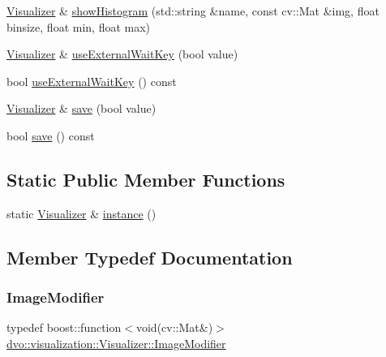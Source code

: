 \begin{DoxyCompactItemize}
\item 
\mbox{\hyperlink{classdvo_1_1visualization_1_1_visualizer}{Visualizer}} \& \mbox{\hyperlink{classdvo_1_1visualization_1_1_visualizer_aca408d9ab7e8e8fc8f9f7c3dd40f0457}{show\+Histogram}} (std\+::string \&name, const cv\+::\+Mat \&img, float binsize, float min, float max)
\item 
\mbox{\hyperlink{classdvo_1_1visualization_1_1_visualizer}{Visualizer}} \& \mbox{\hyperlink{classdvo_1_1visualization_1_1_visualizer_adc47051ac9cbd39cbc94992511137bd6}{use\+External\+Wait\+Key}} (bool value)
\item 
bool \mbox{\hyperlink{classdvo_1_1visualization_1_1_visualizer_a19a81ff0cc68145986c13b1da09affb0}{use\+External\+Wait\+Key}} () const
\item 
\mbox{\hyperlink{classdvo_1_1visualization_1_1_visualizer}{Visualizer}} \& \mbox{\hyperlink{classdvo_1_1visualization_1_1_visualizer_a514dfc248d0676c84161f38132c06cb8}{save}} (bool value)
\item 
bool \mbox{\hyperlink{classdvo_1_1visualization_1_1_visualizer_ad53a6d58f48de5063ca7c196005db380}{save}} () const
\end{DoxyCompactItemize}
\subsection*{Static Public Member Functions}
\begin{DoxyCompactItemize}
\item 
static \mbox{\hyperlink{classdvo_1_1visualization_1_1_visualizer}{Visualizer}} \& \mbox{\hyperlink{classdvo_1_1visualization_1_1_visualizer_a97dc12917863ab3379cea320844c798b}{instance}} ()
\end{DoxyCompactItemize}


\subsection{Member Typedef Documentation}
\mbox{\label{classdvo_1_1visualization_1_1_visualizer_ac33e0b53e7ef7be64e3230f6c91084a0}} 
\subsubsection{\texorpdfstring{Image\+Modifier}{ImageModifier}}
{\footnotesize\ttfamily typedef boost\+::function$<$void(cv\+::\+Mat\&)$>$ \mbox{\hyperlink{classdvo_1_1visualization_1_1_visualizer_ac33e0b53e7ef7be64e3230f6c91084a0}{dvo\+::visualization\+::\+Visualizer\+::\+Image\+Modifier}}}



